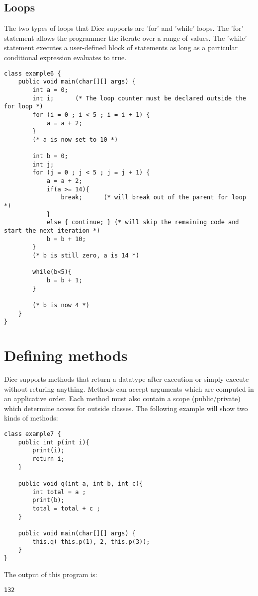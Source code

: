 \begin{homeworkProblem}
	\subsection{Loops}
	The two types of loops that Dice supports are 'for' and 'while' loops. The ’for’ statement allows the programmer the iterate over a range of values. The ’while’ statement executes a user-defined block of statements as long as a particular conditional expression evaluates to true.
	\begin{verbatim}
class example6 {
	public void main(char[][] args) {
		int a = 0;
		int i;		(* The loop counter must be declared outside the for loop *)
 		for (i = 0 ; i < 5 ; i = i + 1) {
 	    	a = a + 2;
 		}
 		(* a is now set to 10 *)

 		int b = 0;
 		int j;
 		for (j = 0 ; j < 5 ; j = j + 1) {
 			a = a + 2;
 	    	if(a >= 14){    
 	    		break;		(* will break out of the parent for loop *)
 	    	}
 	    	else { continue; } (* will skip the remaining code and start the next iteration *)
 	    	b = b + 10;
 		}
 		(* b is still zero, a is 14 *)

 		while(b<5){
 			b = b + 1;
 		}

 		(* b is now 4 *)
	}
}
	\end{verbatim}
	\section{Defining methods}
	Dice supports methods that return a datatype after execution or simply execute without returing anything. Methods can accept arguments which are computed in an applicative order. Each method must also contain a scope (public/private) which determine access for outside classes. The following example will show two kinds of methods:
	\begin{verbatim}
class example7 {
	public int p(int i){ 
		print(i); 
		return i; 
	}

	public void q(int a, int b, int c){ 
		int total = a ; 
		print(b); 
		total = total + c ; 
	}
	
	public void main(char[][] args) {
		this.q( this.p(1), 2, this.p(3));
	}
}
	\end{verbatim}
	The output of this program is: 
	\begin{verbatim}
132
	\end{verbatim}


\end{homeworkProblem}
